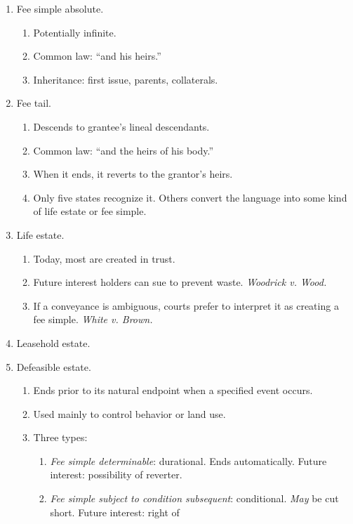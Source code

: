 \begin{enumerate}
    \item Fee simple absolute.
    \begin{enumerate}
        \item Potentially infinite.
        \item Common law: ``and his heirs.''
        \item Inheritance: first issue, parents, collaterals.
    \end{enumerate}
    \item Fee tail.
    \begin{enumerate}
        \item Descends to grantee's lineal descendants.
        \item Common law: ``and the heirs of his body.''
        \item When it ends, it reverts to the grantor's heirs.
        \item Only five states recognize it. Others convert the language into 
        some kind of life estate or fee simple.
    \end{enumerate}
    \item Life estate.
    \begin{enumerate}
        \item Today, most are created in trust.
        \item Future interest holders can sue to prevent waste.  
        \emph{Woodrick v. Wood.}
        \item If a conveyance is ambiguous, courts prefer to interpret it as 
        creating a fee simple. \emph{White v. Brown.}
    \end{enumerate}
    \item Leasehold estate.
    \item Defeasible estate.
    \begin{enumerate}
        \item Ends prior to its natural endpoint when a specified event 
        occurs.
        \item Used mainly to control behavior or land use.
        \item Three types:
        \begin{enumerate}
            \item \emph{Fee simple determinable}: durational. Ends 
            automatically. Future interest: possibility of reverter.
            \item \emph{Fee simple subject to condition subsequent}: 
            conditional. \emph{May} be cut short. Future interest: right of 

\end{enumerate}
\end{enumerate}
\end{enumerate}
